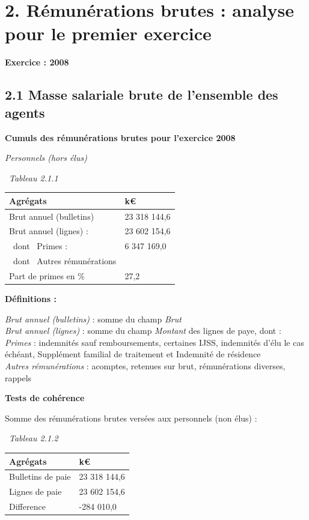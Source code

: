 \hypertarget{remunerations-brutes-analyse-pour-le-premier-exercice}{%
\section{2. Rémunérations brutes : analyse pour le premier
exercice}\label{remunerations-brutes-analyse-pour-le-premier-exercice}}

\textbf{Exercice : 2008 }

\hypertarget{masse-salariale-brute-de-lensemble-des-agents}{%
\subsection{2.1 Masse salariale brute de l'ensemble des
agents}\label{masse-salariale-brute-de-lensemble-des-agents}}

\textbf{Cumuls des rémunérations brutes pour l'exercice 2008 }

\emph{Personnels (hors élus)}

~\emph{Tableau 2.1.1}

\begin{longtable}[]{@{}ll@{}}
\toprule
Agrégats & k€\tabularnewline
\midrule
\endhead
Brut annuel (bulletins) & 23 318 144,6\tabularnewline
Brut annuel (lignes) : & 23 602 154,6\tabularnewline
~dont ~Primes : & 6 347 169,0\tabularnewline
~dont ~Autres rémunérations &\tabularnewline
Part de primes en \% & 27,2\tabularnewline
\bottomrule
\end{longtable}

\textbf{Définitions :}

\emph{Brut annuel (bulletins)} : somme du champ \emph{Brut}\\
\emph{Brut annuel (lignes)} : somme du champ \emph{Montant} des lignes
de paye, dont :\\
\emph{Primes} : indemnités sauf remboursements, certaines IJSS,
indemnités d'élu le cas échéant, Supplément familial de traitement et
Indemnité de résidence\\
\emph{Autres rémunérations} : acomptes, retenues sur brut, rémunérations
diverses, rappels

\textbf{Tests de cohérence}

Somme des rémunérations brutes versées aux personnels (non élus) :

~\emph{Tableau 2.1.2}

\begin{longtable}[]{@{}ll@{}}
\toprule
Agrégats & k€\tabularnewline
\midrule
\endhead
Bulletins de paie & 23 318 144,6\tabularnewline
Lignes de paie & 23 602 154,6\tabularnewline
Difference & -284 010,0\tabularnewline
\bottomrule
\end{longtable}

